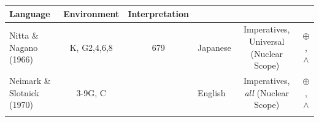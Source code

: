 \documentclass[oneside]{report}
\theoremstyle{definition}
\theoremstyle{definition}
\theoremstyle{definition}
\theoremstyle{remark}
\begin{document}
\begin{longtable}[]{@{}lcclcc@{}}
\begin{minipage}[b]{0.06\columnwidth}
Language\strut
\end{minipage} & \begin{minipage}[b]{0.31\columnwidth}\centering\strut
Environment\strut
\end{minipage} & \begin{minipage}[b]{0.12\columnwidth}\centering\strut
Interpretation\strut
\end{minipage}\tabularnewline
\midrule
\endhead
\begin{minipage}[t]{0.17\columnwidth}\raggedright\strut
Nitta \& Nagano (1966)\strut
\end{minipage} & \begin{minipage}[t]{0.09\columnwidth}\centering\strut
K, G2,4,6,8\strut
\end{minipage} & \begin{minipage}[t]{0.09\columnwidth}\centering\strut
679\strut
\end{minipage} & \begin{minipage}[t]{0.06\columnwidth}\raggedright\strut
Japanese\strut
\end{minipage} & \begin{minipage}[t]{0.31\columnwidth}\centering\strut
Imperatives, Universal (Nuclear Scope)\strut
\end{minipage} & \begin{minipage}[t]{0.12\columnwidth}\centering\strut
\(\oplus\), \(\land\)\strut
\end{minipage}\tabularnewline
\begin{minipage}[t]{0.17\columnwidth}\raggedright\strut
Neimark \& Slotnick (1970)\strut
\end{minipage} & \begin{minipage}[t]{0.09\columnwidth}\centering\strut
3-9G, C\strut
\end{minipage} & \begin{minipage}[t]{0.09\columnwidth}\centering\strut
\strut
\end{minipage} & \begin{minipage}[t]{0.06\columnwidth}\raggedright\strut
English\strut
\end{minipage} & \begin{minipage}[t]{0.31\columnwidth}\centering\strut
Imperatives, \emph{all} (Nuclear Scope)\strut
\end{minipage} & \begin{minipage}[t]{0.12\columnwidth}\centering\strut
\(\oplus\), \(\land\)\strut
\end{minipage}\tabularnewline
\begin{minipage}[t]{0.17\columnwidth}\raggedright\strut

\end{minipage}
\end{longtable}
\end{document}

